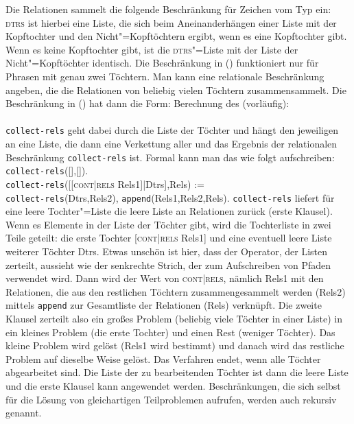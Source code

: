 Die Relationen sammelt die folgende Beschränkung für Zeichen vom Typ  ein:
\ea
\label{constraint-RELS}
 \impl\\
\z
\textsc{dtrs} ist hierbei eine Liste, die sich beim Aneinanderhängen einer Liste mit der Kopftochter
und den Nicht"=Kopftöchtern ergibt, wenn es eine Kopftochter gibt. Wenn es keine Kopftochter gibt,
ist die \textsc{dtrs}"=Liste mit der Liste der Nicht"=Kopftöchter identisch. Die Beschränkung in
() funktioniert nur für Phrasen mit genau zwei Töchtern. Man kann eine relationale
Beschränkung angeben, die die Relationen von beliebig vielen Töchtern zusammensammelt. Die
Beschränkung in () hat dann die Form:
\ea
Berechnung des \relswes (vorläufig):\\
 \impl\\
\z
\texttt{collect-rels} geht dabei durch die Liste der Töchter und hängt den jeweiligen \relsw an eine
Liste, die dann eine Verkettung aller \relswe und das Ergebnis der relationalen Beschränkung
\texttt{collect-rels} ist. Formal kann man das wie folgt aufschreiben:
\ea
\label{constraint-collect-rels}
\texttt{collect-rels}([],[]).\\
\texttt{collect-rels}([[\textsc{cont|rels} Rels1]|Dtrs],Rels) :=\\
\hfill \texttt{collect-rels}(Dtrs,Rels2), \texttt{append}(Rels1,Rels2,Rels).
\z
\medskip
\texttt{collect-rels} liefert für eine leere Tochter"=Liste die leere Liste an Relationen zurück
(erste Klausel). Wenn es Elemente in der Liste der Töchter gibt, wird die Tochterliste in zwei Teile
geteilt: die erste Tochter [\textsc{cont|rels} Rels1] und eine eventuell leere Liste weiterer
Töchter Dtrs. Etwas unschön ist hier, dass der Operator, der Listen zerteilt, aussieht wie der
senkrechte Strich, der zum Aufschreiben von Pfaden verwendet wird. Dann wird der Wert von
\textsc{cont|rels}, nämlich Rels1 mit den Relationen, die aus den restlichen Töchtern
zusammengesammelt werden (Rels2) mittels \texttt{append} zur Gesamtliste der Relationen (Rels)
verknüpft. Die zweite Klausel zerteilt also ein großes Problem (beliebig viele Töchter in einer
Liste) in ein kleines Problem (die erste Tochter) und einen Rest (weniger Töchter). Das kleine
Problem wird gelöst (Rels1 wird bestimmt) und danach wird das restliche Problem auf dieselbe Weise
gelöst. Das Verfahren endet, wenn alle Töchter abgearbeitet sind. Die Liste der zu bearbeitenden
Töchter ist dann die leere Liste und die erste Klausel kann angewendet werden. Beschränkungen, die
sich selbst für die Lösung von gleichartigen Teilproblemen aufrufen, werden auch
rekursiv genannt.  



